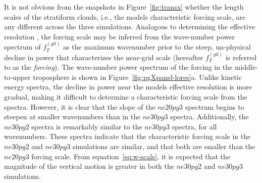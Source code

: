 \documentclass[draft,linenumbers]{agujournal}
\begin{document}
It is not obvious from the snapshots in Figure~\ref{fig:transx} whether the length scales of the stratiform clouds, i.e., the models characteristic forcing scale, are any different across the three simulations. Analogous to determining the effective resolution \citep{S2011LNCSE}, the forcing scale may be inferred from the wave-number power spectrum of $f_T^{(gll)}$ as the maximum wavenumber prior to the steep, un-physical decline in power that characterizes the near-grid scale (hereafter $f_T^{(gll)}$ is referred to as the {\em{forcing}}). The wave-number power spectrum of the forcing in the middle-to-upper troposphere is shown in Figure~\ref{fig:pgXpanel-lores}a. Unlike kinetic energy spectra, the decline in power near the models effective resolution is more gradual, making it difficult to determine a characteristic forcing scale from the spectra. However, it is clear that the slope of the $ne20pg3$ spectrum begins to steepen at smaller wavenumbers than in the $ne30pg3$ spectra. Additionally, the $ne30pg2$ spectra is remarkably similar to the $ne30pg3$ spectra, for all wavenumbers. These spectra indicate that the characteristic forcing scale in the $ne30pg2$ and $ne30pg3$ simulations are similar, and that both are smaller than the $ne20pg3$ forcing scale. From equation~\eqref{eq:w-scale}, it is expected that the magnitude of the vertical motion is greater in both the $ne30pg2$ and $ne30pg3$ simulations.
\end{document}
